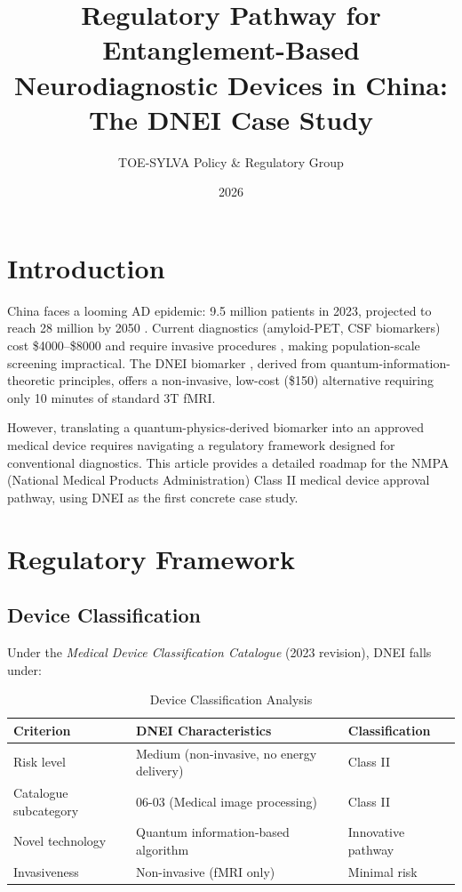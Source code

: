 \documentclass[12pt]{article}
\title{Regulatory Pathway for Entanglement-Based Neurodiagnostic Devices in China:\\
The DNEI Case Study}
\author{TOE-SYLVA Policy \& Regulatory Group}
\date{2026}
\begin{document}
\maketitle

\section{Introduction}
\label{sec:intro}

China faces a looming AD epidemic: 9.5 million patients in 2023, projected to reach 28 million by 2050 \cite{WHO2023}. Current diagnostics (amyloid-PET, CSF biomarkers) cost \$4000--\$8000 and require invasive procedures \cite{Jack2018}, making population-scale screening impractical. The DNEI biomarker \cite{TOESYLVA2026}, derived from quantum-information-theoretic principles, offers a non-invasive, low-cost (\$150) alternative requiring only 10 minutes of standard 3T fMRI.

However, translating a quantum-physics-derived biomarker into an approved medical device requires navigating a regulatory framework designed for conventional diagnostics. This article provides a detailed roadmap for the NMPA (National Medical Products Administration) Class II medical device approval pathway, using DNEI as the first concrete case study.

\section{Regulatory Framework}
\label{sec:framework}

\subsection{Device Classification}

Under the \emph{Medical Device Classification Catalogue} (2023 revision), DNEI falls under:

\begin{table}[ht]
\centering
\caption{Device Classification Analysis}
\label{tab:class}
\begin{tabular}{lll}
\toprule
Criterion & DNEI Characteristics & Classification \\
\midrule
Risk level & Medium (non-invasive, no energy delivery) & Class II \\
Catalogue subcategory & 06-03 (Medical image processing) & Class II \\
Novel technology & Quantum information-based algorithm & Innovative pathway \\
Invasiveness & Non-invasive (fMRI only) & Minimal risk \\
\bottomrule
\end{tabular}
\end{table}
\end{document}
